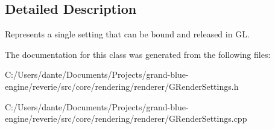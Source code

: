 \subsection{Detailed Description}
Represents a single setting that can be bound and released in GL. 

The documentation for this class was generated from the following files\+:\begin{DoxyCompactItemize}
\item 
C\+:/\+Users/dante/\+Documents/\+Projects/grand-\/blue-\/engine/reverie/src/core/rendering/renderer/G\+Render\+Settings.\+h\item 
C\+:/\+Users/dante/\+Documents/\+Projects/grand-\/blue-\/engine/reverie/src/core/rendering/renderer/G\+Render\+Settings.\+cpp\end{DoxyCompactItemize}
